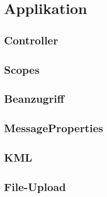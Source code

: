 \section{Applikation}
\label{JumpApplikation}
\subsection{Controller}
\subsection{Scopes}
\subsection{Beanzugriff}
\subsection{MessageProperties}
\subsection{KML}
\subsection{File-Upload}